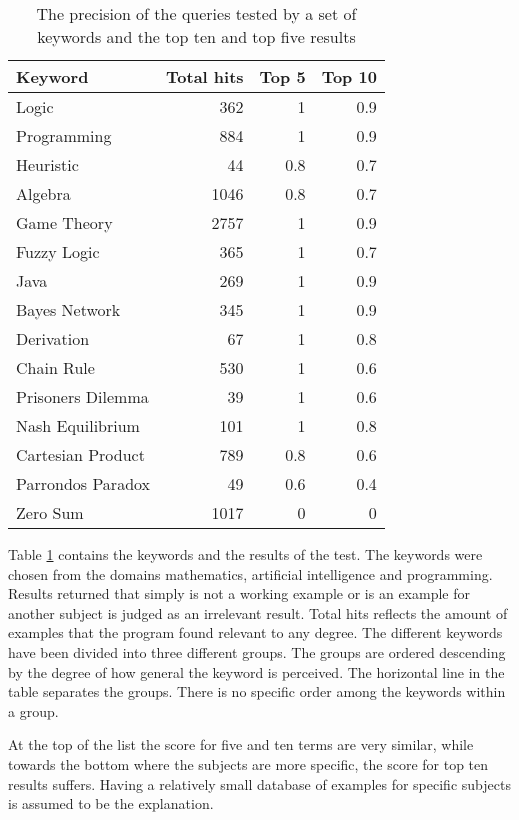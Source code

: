 \begin{table}[h!]
\centering
\begin{tabular} {|| p{15em} | r | r | r ||} 
 \hline
 Keyword & Total hits & Top 5 & Top 10 \\ [0.5ex] 
 \hline

Logic & 362 & 1 & 0.9 \\
Programming & 884 & 1 & 0.9 \\
Heuristic & 44 & 0.8 & 0.7 \\
Algebra & 1046 & 0.8 & 0.7 \\
Game Theory & 2757 & 1 & 0.9 \\
\hline
Fuzzy Logic & 365 & 1 & 0.7 \\
Java & 269 & 1 & 0.9 \\
Bayes Network & 345 & 1 & 0.9 \\
Derivation & 67 & 1 & 0.8 \\
\hline
Chain Rule & 530 & 1 & 0.6 \\
Prisoners Dilemma & 39 & 1 & 0.6 \\
Nash Equilibrium & 101 & 1 & 0.8 \\
Cartesian Product & 789 & 0.8 & 0.6 \\
Parrondos Paradox & 49 & 0.6 & 0.4 \\
Zero Sum & 1017 & 0 & 0 \\

 \hline
\end{tabular}
\caption{The precision of the queries tested by a set of keywords and the top ten and top five results}
\label{table:precision_test}
\end{table}

Table \ref{table:precision_test} contains the keywords and the results of the test. The keywords were chosen from the domains mathematics, artificial intelligence and programming. Results returned that simply is not a working example or is an example for another subject is judged as an irrelevant result. Total hits reflects the amount of examples that the program found relevant to any degree. The different keywords have been divided into three different groups. The groups are ordered descending by the degree of how general the keyword is perceived. The horizontal line in the table separates the groups. There is no specific order among the keywords within a group.

At the top of the list the score for five and ten terms are very similar, while towards the bottom where the subjects are more specific, the score for top ten results suffers. Having a relatively small database of examples for specific subjects is assumed to be the explanation.

